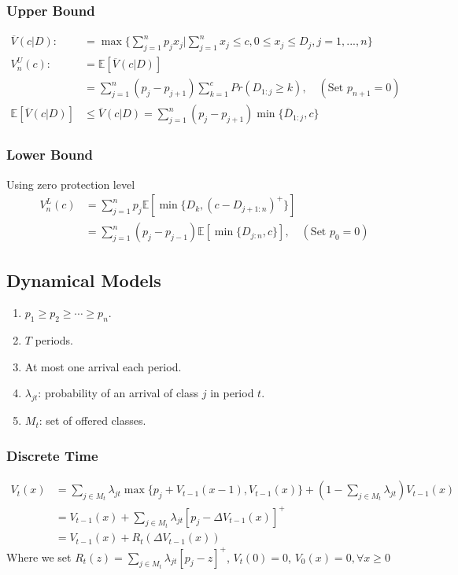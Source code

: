 \documentclass[11pt,a4paper]{article}
\begin{document}
\subsubsection{Upper Bound}
\begin{equation}
    \begin{aligned}
        \overline{V}(c|D):&=\max\{\sum_{j=1}^np_jx_j|\sum_{j=1}^nx_j\leq c,0\leq x_j\leq D_j,j=1,...,n\}\\
        V_n^U(c):&=\mathbb{E}[\overline{V}(c|D)]\\
        &=\sum_{j=1}^n(p_j-p_{j+1})\sum_{k=1}^cPr(D_{1:j}\geq k),\quad (\text{Set }p_{n+1}=0)\\
        \mathbb{E}[\overline{V}(c|D)]&\leq \overline{V}(c|D)=\sum_{j=1}^n(p_j-p_{j+1})\min\{\overline{D}_{1:j},c\}
    \end{aligned}
    \nonumber
\end{equation}
\subsubsection{Lower Bound}
Using zero protection level
\begin{equation}
    \begin{aligned}
        V_n^L(c)&=\sum_{j=1}^n p_j \mathbb{E}[\min\{D_k,(c-D_{j+1:n})^+\}]\\
        &=\sum_{j=1}^n(p_j-p_{j-1})\mathbb{E}[\min\{D_{j:n},c\}],\quad (\text{Set }p_{0}=0)
    \end{aligned}
    \nonumber
\end{equation}


\subsection{Dynamical Models}
\begin{enumerate}[$\bullet$]
    \item $p_1\geq p_2\geq \cdots \geq p_n$.
    \item $T$ periods.
    \item At most one arrival each period.
    \item $\lambda_{jt}$: probability of an arrival of class $j$ in period $t$.
    \item $M_t$: set of offered classes.
\end{enumerate}

\subsubsection{Discrete Time}
\begin{equation}
    \begin{aligned}
        V_t(x)&=\sum_{j\in M_t}\lambda_{jt}\max\{p_j+V_{t-1}(x-1),V_{t-1}(x)\}+(1-\sum_{j\in M_t}\lambda_{jt})V_{t-1}(x)\\
        &=V_{t-1}(x)+\sum_{j\in M_t}\lambda_{jt}[p_j-\Delta V_{t-1}(x)]^+\\
        &=V_{t-1}(x)+R_t(\Delta V_{t-1}(x))
    \end{aligned}
    \nonumber
\end{equation}
Where we set $R_t(z)=\sum_{j\in M_t}\lambda_{jt}[p_j-z]^+$, $V_t(0)=0$, $V_0(x)=0,\forall x\geq 0$
\end{document}
